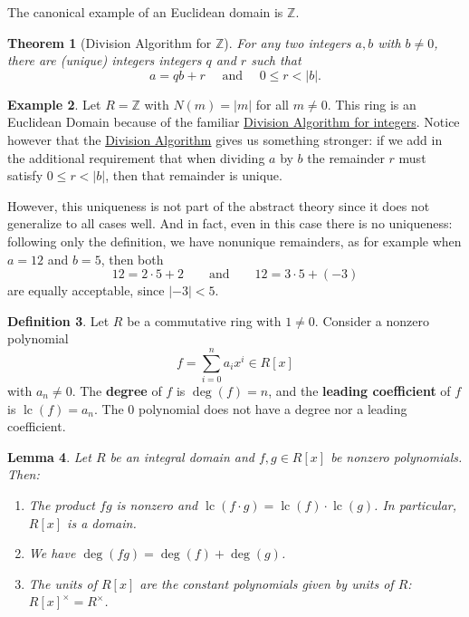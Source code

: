 \documentclass[12pt]{report}
\newtheorem{theorem}{Theorem}[chapter]
\newtheorem{lemma}[theorem]{Lemma}
\numberwithin{equation}{section}
\numberwithin{theorem}{chapter}
\theoremstyle{definition}
\newtheorem{definition}[theorem]{Definition}
\newtheorem{example}[theorem]{Example}
\newtheorem*{basic properties}{Basic Properties}
\newtheorem*{Important Remark}{Important Remark}
\newcommand{\df}[1]{{\bf #1}\index{#1}}
\newcommand{\Z}{\mathbb{Z}}
\DeclareMathOperator{\lc}{lc}
\begin{document}
The canonical example of an Euclidean domain is $\Z$.


\begin{theorem}[Division Algorithm for $\Z$]\label{division algorithm integers}
	For any two integers $a, b$ with $b \neq 0$, there are (unique) integers integers $q$ and $r$ such that 
$$a = qb + r \quad \text{ and } \quad 0 \leqslant r < |b|.$$
\end{theorem}


\begin{example}\label{Z is an euclidean domain}
Let $R = \Z$ with $N(m) = |m|$ for all $m \neq 0$. This ring is an Euclidean Domain because of the familiar \hyperref[division algorithm integers]{Division Algorithm for integers}. Notice however that the \hyperref[division algorithm integers]{Division Algorithm} gives us something stronger: if we add in the additional requirement that when dividing $a$ by $b$ the remainder $r$ must satisfy $0 \leqslant r < |b|$, then that remainder is unique. 

However, this uniqueness is not part of the abstract theory since it does not generalize to all cases well. And in fact, even in this case there is no uniqueness: following only the definition, we have nonunique remainders, as for example when $a = 12$ and $b = 5$, then both
$$12 = 2 \cdot 5 + 2 \qquad \text{and} \qquad 12 = 3 \cdot 5 + (-3)$$
are equally acceptable, since $|-3| < 5$. 
\end{example}



\begin{definition}
Let $R$ be a commutative ring with $1 \neq 0$. Consider a nonzero polynomial 
$$f = \sum_{i=0}^n a_i x^i\in R[x]$$ 
with $a_n \neq 0$.
The {\bf degree} of $f$ is $\deg(f) = n$, and the \df{leading coefficient} of $f$ is $\lc(f) = a_n$. The $0$ polynomial does not have a degree nor a leading coefficient.
\end{definition}



\begin{lemma}\label{degree of products of polynomials over domains}
Let $R$ be an integral domain and $f, g \in R[x]$ be nonzero polynomials. Then:
\begin{enumerate}[itemsep=-0.1em,leftmargin=20pt]
\vspace{-0.5em}
\item The product $fg$ is nonzero and $\lc(f \cdot g) = \lc(f) \cdot \lc(g)$.
In particular, $R[x]$ is a domain.
\item We have $\deg(f g)=\deg(f)+\deg(g)$.
\item The units of $R[x]$ are the constant polynomials given by units of $R$: $R[x]^\times=R^\times$.
\end{enumerate}
\end{lemma}
\end{document}
